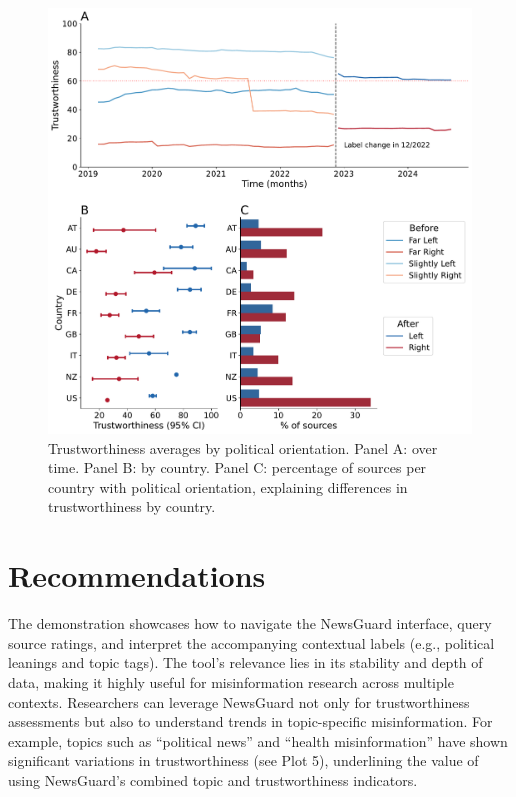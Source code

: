 \documentclass{article}
\begin{document}
\begin{figure}[H]
    \centering
    \includegraphics[width=\textwidth]{figures/orientation_panel.pdf}
    \caption{Trustworthiness averages by political orientation. Panel A: over time. Panel B: by country. Panel C: percentage of sources per country with political orientation, explaining differences in trustworthiness by country.}
    \label{fig:orientation_panel}
\end{figure}
\section{Recommendations}
The demonstration showcases how to navigate the NewsGuard interface, query source ratings, and interpret the accompanying contextual labels (e.g., political leanings and topic tags). 
The tool’s relevance lies in its stability and depth of data, making it highly useful for misinformation research across multiple contexts. 
Researchers can leverage NewsGuard not only for trustworthiness assessments but also to understand trends in topic-specific misinformation. 
For example, topics such as “political news” and “health misinformation” have shown significant variations in trustworthiness (see Plot 5), underlining the value of using NewsGuard’s combined topic and trustworthiness indicators.
\end{document}
